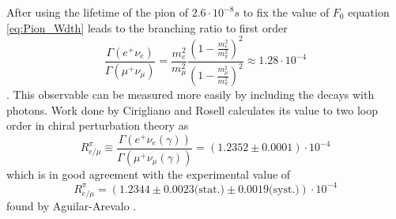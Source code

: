 After using the lifetime of the pion of $2.6\cdot 10^{-8}s$ to fix the value of $F_0$ equation \ref{eq:Pion_Wdth} leads to the branching ratio to first order
\begin{equation}
\frac{\Gamma(e^+ \nu_e)}{\Gamma(\mu^+ \nu_\mu)}=\frac{m_e^2}{m_\mu^2}\frac{\left(1-\frac{m_e^2}{m_\pi^2}\right)^2}{\left(1-\frac{m_\mu^2}{m_\pi^2}\right)^2} \approx 1.28\cdot 10^{-4}
\end{equation}.
This observable can be measured more easily by including the decays with photons.
Work done by Cirigliano and Rosell \cite{PhysRevLett.99.231801} calculates its value to two loop order in chiral perturbation theory as
\begin{equation}
R^\pi_{e/\mu} \equiv \frac{\Gamma(e^+ \nu_e(\gamma))}{\Gamma(\mu^+ \nu_\mu(\gamma))}=(1.2352	\pm0.0001)\cdot 10^{-4}
\end{equation}
which is in good agreement with the experimental value of
\begin{equation}
R^\pi_{e/\mu} =(1.2344\pm 0.0023\text{(stat.)} \pm 0.0019\text{(syst.)})\cdot 10^{-4}
\end{equation}
found by Aguilar-Arevalo \cite{PhysRevLett.115.071801}.
